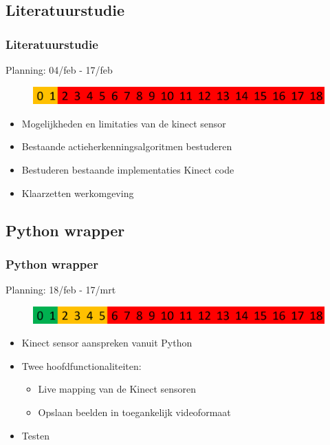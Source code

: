 \documentclass[]{beamer}
\begin{document}
	\subsection{Literatuurstudie}
	\begin{frame}
	\frametitle{Literatuurstudie}
		Planning: 04/feb - 17/feb
		\begin{figure}
		\includegraphics[width=\textwidth]{literatuur}
		\end{figure}
		\begin{itemize}
			\item<1- > Mogelijkheden en limitaties van de kinect sensor
			\item<1- > Bestaande actieherkenningsalgoritmen bestuderen
			\item<1- > Bestuderen bestaande implementaties Kinect code
			\item<1- > Klaarzetten werkomgeving
		\end{itemize}
	\end{frame}

	\subsection{Python wrapper}
	\begin{frame}
	\frametitle{Python wrapper}
		Planning: 18/feb - 17/mrt
		\begin{figure}
		\includegraphics[width=\textwidth]{wrapper}
		\end{figure}
		\begin{itemize}
			\item<1- > Kinect sensor aanspreken vanuit Python
			\item<1- > Twee hoofdfunctionaliteiten:
			\begin{itemize}
				\item<1- > Live mapping van de Kinect sensoren
				\item<1- > Opslaan beelden in toegankelijk videoformaat
			\end{itemize}
			\item<1- > Testen
		\end{itemize}
	\end{frame}
\end{document}
